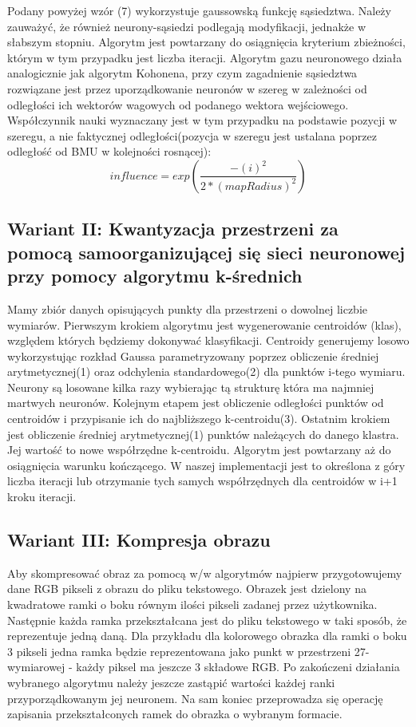 \documentclass{classrep}
\begin{document}
{{\begin{equation}
\end{equation}
Podany powyżej wzór (7) wykorzystuje gaussowską funkcję sąsiedztwa.
Należy zauważyć, że również neurony-sąsiedzi podlegają modyfikacji, jednakże w słabszym stopniu. Algorytm jest powtarzany do osiągnięcia kryterium zbieżności, którym w tym przypadku jest liczba iteracji. Algorytm gazu neuronowego działa analogicznie jak algorytm Kohonena, przy czym zagadnienie sąsiedztwa rozwiązane jest przez uporządkowanie neuronów w szereg w zależności od odległości ich wektorów wagowych od podanego wektora wejściowego. Współczynnik nauki wyznaczany jest w tym przypadku na podstawie pozycji w szeregu, a nie faktycznej odległości(pozycja w szeregu jest ustalana poprzez odległość od BMU w kolejności rosnącej):
\begin{equation}
influence=exp(\dfrac{-(i)^2}{2*(mapRadius)^2})
\end{equation}

\subsection*{Wariant II: Kwantyzacja przestrzeni za pomocą samoorganizującej się sieci neuronowej przy pomocy algorytmu k-średnich}
Mamy zbiór danych opisujących punkty dla przestrzeni o dowolnej liczbie wymiarów. Pierwszym krokiem algorytmu jest wygenerowanie centroidów (klas), względem których będziemy dokonywać klasyfikacji. Centroidy generujemy losowo wykorzystując rozkład Gaussa parametryzowany poprzez obliczenie średniej arytmetycznej(1) oraz odchylenia standardowego(2) dla punktów i-tego wymiaru. Neurony są losowane kilka razy wybierając tą strukturę która ma najmniej martwych neuronów. Kolejnym etapem jest obliczenie odległości punktów od centroidów i przypisanie ich do najbliższego k-centroidu(3). Ostatnim krokiem jest obliczenie średniej arytmetycznej(1) punktów należących do danego klastra. Jej wartość to nowe współrzędne k-centroidu. Algorytm jest powtarzany aż do osiągnięcia warunku kończącego. W naszej implementacji jest to określona z góry liczba iteracji lub otrzymanie tych samych współrzędnych dla centroidów w i+1 kroku iteracji.

\subsection*{Wariant III: Kompresja obrazu}
Aby skompresować obraz za pomocą w/w algorytmów najpierw przygotowujemy dane RGB pikseli z obrazu do pliku tekstowego. Obrazek jest dzielony na kwadratowe ramki o boku równym ilości pikseli zadanej przez użytkownika. Następnie każda ramka przekształcana jest do pliku tekstowego w taki sposób, że reprezentuje jedną daną. Dla przykładu dla kolorowego obrazka dla ramki o boku 3 pikseli jedna ramka będzie reprezentowana jako punkt w przestrzeni 27-wymiarowej - każdy piksel ma jeszcze 3 składowe RGB. Po zakończeni działania wybranego algorytmu należy jeszcze zastąpić wartości każdej ranki przyporządkowanym jej neuronem. Na sam koniec przeprowadza się operację zapisania przekształconych ramek do obrazka o wybranym formacie. 

}}
\end{document}
